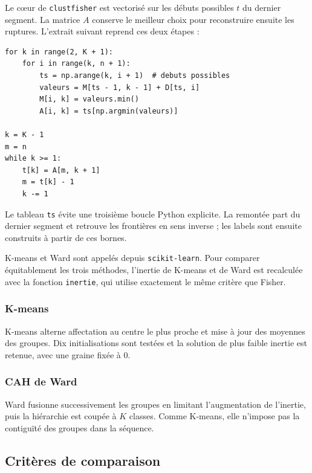 \documentclass[10pt,a4paper]{article}
\begin{document}
Le cœur de \texttt{clustfisher} est vectorisé sur les débuts possibles $t$ du
dernier segment. La matrice $A$ conserve le meilleur choix pour reconstruire
ensuite les ruptures. L'extrait suivant reprend ces deux étapes :

\begin{lstlisting}
for k in range(2, K + 1):
    for i in range(k, n + 1):
        ts = np.arange(k, i + 1)  # debuts possibles
        valeurs = M[ts - 1, k - 1] + D[ts, i]
        M[i, k] = valeurs.min()
        A[i, k] = ts[np.argmin(valeurs)]

k = K - 1
m = n
while k >= 1:
    t[k] = A[m, k + 1]
    m = t[k] - 1
    k -= 1
\end{lstlisting}

Le tableau \texttt{ts} évite une troisième boucle Python explicite. La remontée
part du dernier segment et retrouve les frontières en sens inverse ; les labels
sont ensuite construits à partir de ces bornes.

K-means et Ward sont appelés depuis \texttt{scikit-learn}. Pour comparer
équitablement les trois méthodes, l'inertie de K-means et de Ward est recalculée
avec la fonction \texttt{inertie}, qui utilise exactement le même critère que Fisher.

\subsubsection*{K-means}
K-means alterne affectation au centre le plus proche et mise à jour des moyennes
des groupes. Dix initialisations sont testées et la solution de plus faible
inertie est retenue, avec une graine fixée à 0.

\subsubsection*{CAH de Ward}
Ward fusionne successivement les groupes en limitant l'augmentation de l'inertie,
puis la hiérarchie est coupée à $K$ classes. Comme K-means, elle n'impose pas
la contiguïté des groupes dans la séquence.


\clearpage
\subsection{Critères de comparaison}
\end{document}
